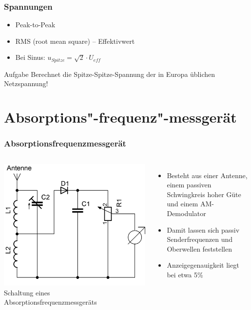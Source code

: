 \begin{frame}
  \frametitle{Spannungen}
  \begin{center}
    \begin{itemize}
      \item Peak-to-Peak
      \item RMS (root mean square) -- Effektivwert
      \item Bei Sinus: $u_{Spitze} = \sqrt{2} \cdot U_{eff}$ \\
    \end{itemize}
  \end{center}
  \begin{exampleblock}{Aufgabe}
    Berechnet die Spitze-Spitze-Spannung der in Europa üblichen Netzspannung!
  \end{exampleblock}
\end{frame}

\section*{Absorptions"-frequenz"-messgerät}
\begin{frame}
  \frametitle{Absorptionsfrequenzmessgerät}
  \begin{columns}
    \begin{center}
      \includegraphics[width=\textwidth,height=.8\textheight,keepaspectratio]{a16/Absorptionsfrequenzmesser.png}\\
      {\tiny Schaltung eines Absorptionsfrequenzmessgeräts}
    \end{center}
    \begin{itemize}
      \item Besteht aus einer Antenne, einem passiven Schwingkreis hoher Güte und  einem AM-Demodulator
      \item Damit lassen sich passiv Senderfrequenzen und Oberwellen feststellen
      \item Anzeigegenauigkeit liegt bei etwa 5\%
    \end{itemize}
  \end{columns}
\end{frame}

